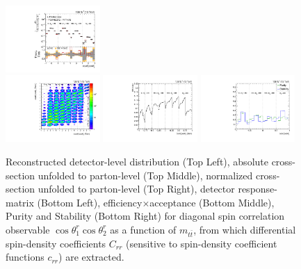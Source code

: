 \begin{refsection}
\begin{figure}[htb]
\begin{center}
 \includegraphics[width=0.32\textwidth]{fig_fullRun2UL/unfolding/combined/UnfoldedResultsNorm_c_rr_mttbar.pdf} \\
 \includegraphics[width=0.32\textwidth]{fig_fullRun2UL/unfolding/combined/ResponseMatrix_c_rr_mttbar.pdf}
 \includegraphics[width=0.32\textwidth]{fig_fullRun2UL/unfolding/combined/TotEff_c_rr_mttbar.pdf}
 \includegraphics[width=0.32\textwidth]{fig_fullRun2UL/unfolding/combined/PurStab_c_rr_mttbar.pdf} \\
\caption{Reconstructed detector-level distribution (Top Left), absolute cross-section unfolded to parton-level (Top Middle), normalized cross-section unfolded to parton-level (Top Right), detector response-matrix (Bottom Left), efficiency$\times$acceptance (Bottom Middle), Purity and Stability (Bottom Right) for diagonal spin correlation observable $\cos\theta_{1}^{r}\cos\theta_{2}^{r}$ as a function of $m_{t\bar{t}}$, from which differential spin-density coefficients $C_{rr}$ (sensitive to spin-density coefficient functions $c_{r r}$) are extracted.}
\label{fig:c_rr_mttbar}
\end{center}
\end{figure}
\clearpage
\begin{figure}[htb]

\end{figure}
\end{refsection}
